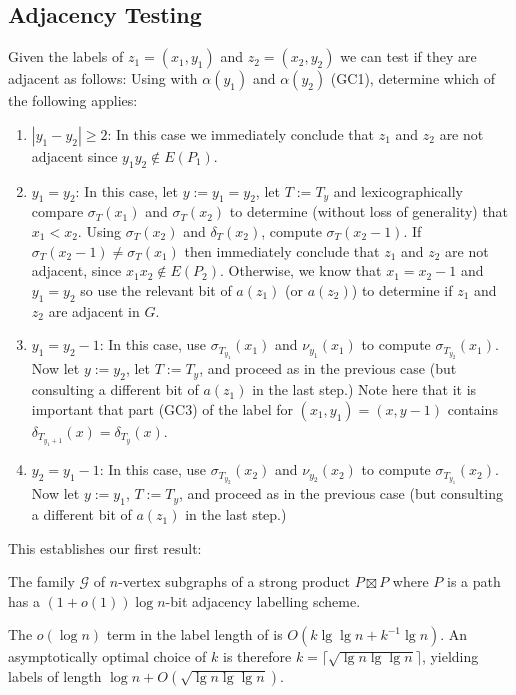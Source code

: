 \documentclass[kpfonts]{patmorin}
\let\ge\geqslant
\begin{document}
\subsection{Adjacency Testing}

Given the labels of $z_1=(x_1,y_1)$ and $z_2=(x_2,y_2)$ we can test if they are adjacent as follows: Using with $\alpha(y_1)$ and $\alpha(y_2)$ (GC1), determine which of the following applies:
\begin{enumerate}
  \item $|y_1-y_2|\ge 2$: In this case we immediately conclude that $z_1$ and $z_2$ are not adjacent since $y_1y_2\not\in E(P_1)$.  
  
  \item $y_1=y_2$: In this case, let $y:=y_1=y_2$, let $T:=T_y$ and lexicographically compare $\sigma_T(x_1)$ and $\sigma_T(x_2)$ to determine (without loss of generality) that $x_1<x_2$.  Using $\sigma_{T}(x_2)$ and $\delta_{T}(x_2)$, compute $\sigma_T(x_2-1)$.  If $\sigma_T(x_2-1)\neq \sigma_T(x_1)$ then immediately conclude that $z_1$ and $z_2$ are not adjacent, since $x_1x_2\not\in E(P_2)$.  Otherwise, we know that $x_1=x_2-1$ and $y_1=y_2$ so use the relevant bit of $a(z_1)$ (or $a(z_2)$) to determine if $z_1$ and $z_2$ are adjacent in $G$.
  
  \item $y_1=y_2-1$: In this case, use $\sigma_{T_{y_1}}(x_1)$ and $\nu_{y_1}(x_1)$ to compute $\sigma_{T_{y_2}}(x_1)$.  Now let $y:=y_2$, let $T:=T_{y}$, and proceed as in the previous case (but consulting a different bit of $a(z_1)$ in the last step.)  Note here that it is important that part (GC3) of the label for $(x_1,y_1)=(x,y-1)$ contains $\delta_{T_{y_1+1}}(x)=\delta_{T_{y}}(x)$.
  
  \item $y_2=y_1-1$: In this case, use $\sigma_{T_{y_2}}(x_2)$ and $\nu_{y_2}(x_2)$ to compute $\sigma_{T_{y_1}}(x_2)$.  Now let $y:=y_1$, $T:=T_{y}$, and proceed as in the previous case (but consulting a different bit of $a(z_1)$ in the last step.)
\end{enumerate}

This establishes our first result:

\begin{thm}
  The family $\mathcal{G}$ of $n$-vertex subgraphs of a strong product $P\boxtimes P$ where $P$ is a path has a $(1+o(1))\log n$-bit adjacency labelling scheme.
\end{thm}

\begin{rem}
  The $o(\log n)$ term in the label length of  is $O(k\lg\lg n + k^{-1}\lg n)$.  An asymptotically optimal choice of $k$ is therefore $k=\lceil\sqrt{\lg n\lg\lg n}\rceil$, yielding labels of length $\log n + O(\sqrt{\lg n\lg\lg n})$.
\end{rem}
\end{document}
